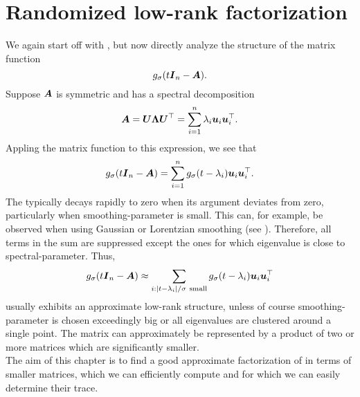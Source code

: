 \chapter{Randomized low-rank factorization}
\label{chp:3-nystrom}

We again start off with , but now
directly analyze the structure of the matrix function
\begin{equation}
    g_{\sigma}(t\boldsymbol{I}_n - \boldsymbol{A}).
    \label{equ:3-nystrom-matrix-function}
\end{equation}
Suppose $\boldsymbol{A}$ is symmetric and has a spectral decomposition
\begin{equation}
    \boldsymbol{A}
        = \boldsymbol{U} \boldsymbol{\Lambda} \boldsymbol{U}^{\top} 
        = \sum_{i=1}^n \lambda_i \boldsymbol{u}_i \boldsymbol{u}_i^{\top}.
    \label{equ:3-nystrom-matrix-spectral-decomposition}
\end{equation}
Appling the matrix function to this expression, we see that
\begin{equation}
    g_{\sigma}(t\boldsymbol{I}_n - \boldsymbol{A})
        = \sum_{i=1}^n g_{\sigma}(t - \lambda_i) \boldsymbol{u}_i \boldsymbol{u}_i^{\top}.
    \label{equ:3-nystrom-matrix-function-spectral-decomposition}
\end{equation}
The  typically decays
rapidly to zero when its argument deviates from zero, particularly when
\gls{smoothing-parameter} is small. This can, for example, be observed when using Gaussian
or Lorentzian smoothing (see ).
Therefore, all terms in the sum 
are suppressed except the ones for which \gls{eigenvalue} is close to \gls{spectral-parameter}.
Thus,
\begin{equation}
    g_{\sigma}(t\boldsymbol{I}_n - \boldsymbol{A})
        \approx \sum_{i: |t - \lambda_i|/\sigma~\text{small}} g_{\sigma}(t - \lambda_i) \boldsymbol{u}_i \boldsymbol{u}_i^{\top}
    \label{equ:3-nystrom-matrix-function-low-rank-approximation}
\end{equation}
usually exhibits an approximate low-rank structure, unless of course \gls{smoothing-parameter} is chosen exceedingly big or all eigenvalues
are clustered around a single point. The matrix can approximately 
be represented by a product of two or more matrices which are significantly smaller.\\

The aim of this chapter is to find a good approximate factorization of 
in terms of smaller matrices, which we can efficiently compute and for which we can
easily determine their trace.


